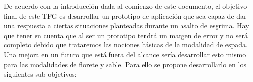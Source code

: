 \documentclass[11pt,a4paper,twoside,final]{article}
\begin{document}

De acuerdo con la introducción dada al comienzo de este documento, el objetivo final de este
TFG es desarrollar un prototipo de aplicación que sea capaz de dar una respuesta a ciertas situaciones
planteadas durante un asalto de esgrima. Hay que tener en cuenta que al ser un prototipo tendrá un margen
de error y no será completo debido que trataremos las nociones básicas de la modalidad de espada.
 Una mejora en un futuro que está fuera del alcance sería desarrollar esto mismo para las modalidades
 de florete y sable. Para ello se propone desarrollarlo en los siguientes sub-objetivos:




\end{document}
